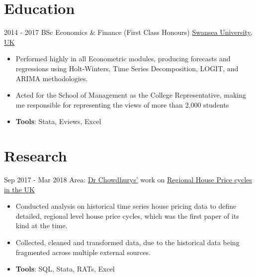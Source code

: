 \documentclass[letterpaper]{twentysecondcv} %
\begin{document}
\section{Education}

\begin{twenty} %
		\twentyitem
    	{2014 - 2017}
        {}
        {BSc Economics \& Finance \textnormal{(First Class Honours)}}
        {\href{http://www.swansea.ac.uk/}{Swansea University, UK}} 	%
        {}
        {	
       	{\begin{itemize}
        			\item Performed highly in all Econometric modules, producing forecasts and regressions using Holt-Winters, Time Series Decomposition, LOGIT, and ARIMA methodologies.
        			\item Acted for the School of Management as the College Representative, making me responsible for representing the views of more than 2,000 students
        			\item \textbf{Tools}: Stata, Eviews, Excel \vspace{2mm}
       	  \end{itemize}}
        }
    
\end{twenty}

\section{Research}
\begin{twenty}
	\twentyitem
    	{Sep 2017 -}
    	{Mar 2018}
    	{Area: \textnormal{\href{http://www.swansea.ac.uk/staff/som/academic-staff/r.chowdhury/}{Dr Chowdhurys'} work on {\href{http://www.emeraldinsight.com/doi/abs/10.1108/JERER-02-2014-0014}{Regional House Price cycles in the UK}}}}
    	{}
        {\begin{itemize}
        		\item Conducted analysis on historical time series house pricing data to define detailed, regional level house price cycles, which was the first paper of its kind at the time.
        		\item Collected, cleaned and transformed data, due to the historical data being fragmented across multiple external sources.
        		\item \textbf{Tools}: SQL, Stata, RATs, Excel 
        		\vspace{2mm}
		\end{itemize}}
	
\end{twenty}
\end{document}

